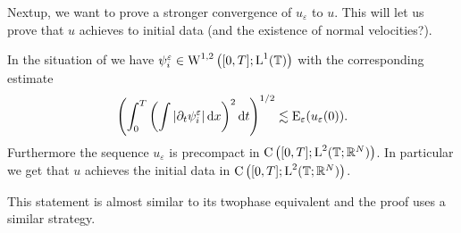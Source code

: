 Nextup, we want to prove a stronger convergence of $ u_{ \varepsilon } $ to $ u $. This will let us prove that $ u $ achieves to initial data (and the existence of normal velocities?).

\begin{lemma}
	In the situation of  we have 
	$ \psi_{ i }^{ \varepsilon } \in \operatorname{W}^{ 1 , 2 } \left(
		[ 0 , T ] ; \operatorname{L}^{ 1 } ( \operatorname{\mathbb{T}} )
	\right)
	$
	with the corresponding estimate
	\begin{equation}
		\label{l2_estimate_on_partial_t_psi_i}
		\left(
			\int_{ 0 }^{ T }
				\left(
					\int
						\abs{ \partial_{ t } \psi_{ i }^{ \varepsilon } }
					\dd{ x }
				\right)^{ 2 }
			\dd{ t }
		\right)^{ 1/2 }
		\lesssim
		\operatorname{E}_{ \varepsilon } ( u_{ \varepsilon } ( 0 ) ).
	\end{equation}
	Furthermore the sequence $ u_{ \varepsilon } $ is precompact in 
	$ \operatorname{C} \left(
		[ 0 , T ] ; \operatorname{L}^{ 2 } ( \operatorname{\mathbb{T}} ; \mathbb{ R }^{ N } )
	\right) $.
	In particular we get that $ u $ achieves the initial data in 
	$ \operatorname{C} \left( [ 0 , T ] ; \operatorname{L}^{ 2 } ( \operatorname{\mathbb{T}} ; \mathbb{ R }^{ N } )
	\right) $.
\end{lemma}

\begin{remark}
	This statement is almost similar to its twophase equivalent  and the proof uses a similar strategy.
\end{remark}

